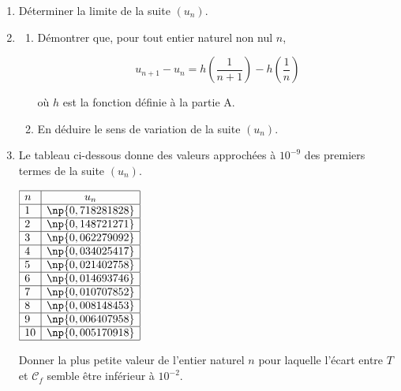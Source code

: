\begin{enumerate}[resume]
\item Déterminer la limite de la suite $\left(u_n\right)$.
\item 
	\begin{enumerate}
		\item Démontrer que, pour tout entier naturel non nul $n$,
		
\[u_{n+1} - u_n = h\left(\dfrac{1}{n + 1}\right) - h\left(\dfrac{1}{n}\right) \]

où $h$ est la fonction définie à la partie A.
		\item En déduire le sens de variation de la suite $\left(u_n\right)$.
	\end{enumerate}
\item Le tableau ci-dessous donne des valeurs approchées à $10^{-9}$ des premiers termes de la suite $\left(u_n\right)$.

\begin{center}
$\begin{array}{|l|c|}\hline
n &u_n\\ \hline
1 &\np{0,718281828}\\ \hline
2 &\np{0,148721271}\\ \hline
3 &\np{0,062279092}\\ \hline
4 &\np{0,034025417}\\ \hline
5 &\np{0,021402758}\\ \hline
6 &\np{0,014693746}\\ \hline
7 &\np{0,010707852}\\ \hline
8 &\np{0,008148453}\\ \hline
9 &\np{0,006407958}\\ \hline
10 &\np{0,005170918}\\ \hline
\end{array}$
\end{center}

Donner la plus petite valeur de l'entier naturel $n$ pour laquelle l'écart entre $T$ et $\mathcal{C}_f$ semble être inférieur à $10^{-2}$.


\end{enumerate}

\bigskip
